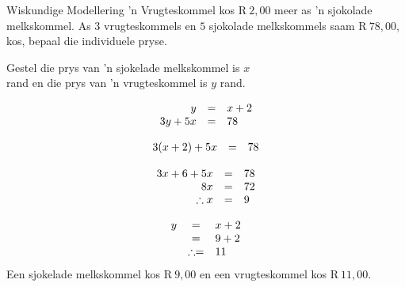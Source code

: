 \begin{wex}
{Wiskundige Modellering}
{
’n
Vrugteskommel kos R$~2,00$ meer as ’n sjokolade melkskommel. As $3$ vrugteskommels en $5$ sjokolade melkskommels saam  R$~78,00$, kos,
bepaal die individuele pryse.}

{
Gestel die prys van ’n sjokelade melkskommel is $x$ 
\\ rand en die prys van ’n vrugteskommel is  $y$ rand.


\begin{equation*}
\begin{array}{ccl} \hfill y &=& x+2 \hfill \\
\hfill 3y+5x& =& 78\hfill 
\end{array}
\end{equation*}

\begin{equation*}
\begin{array}{ccl}\hfill 3(x+2)+5x& =& 78\hfill \\
\end{array}
\end{equation*}

\begin{equation*}
\begin{array}{ccl}
 \hfill 3x+6+5x& =& 78\hfill \\ 
\hfill 8x& =& 72\hfill \\ 
\hfill \therefore x& =& 9\hfill \\  \end{array}
\end{equation*}

\begin{equation*}
\begin{array}{ccl}
\hfill y& =& x+2\hfill \\
 \hfill & =& 9+2\hfill \\ 
\hfill & \therefore =& 11\hfill  \end{array}
\end{equation*}
Een sjokelade melkskommel kos R$~9,00$ en een vrugteskommel
kos R$~ 11,00$.
}
\end{wex}

